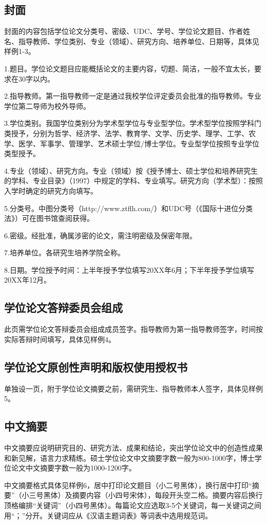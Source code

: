 \subsection{封面}
封面的内容包括学位论文分类号、密级、UDC、学号、学位论文题目、作者姓名、指导教师、学位类别、专业（领域）、研究方向、培养单位、日期等，具体见样例1-3。

1.题目。学位论文题目应能概括论文的主要内容，切题、简洁，一般不宜太长，要求在30字以内。

2.指导教师。第一指导教师一定是通过我校学位评定委员会批准的指导教师。专业学位第二导师为校外导师。

3.学位类别。我国学位类别分为学术型学位与专业型学位。学术型学位按照学科门类授予，分别为哲学、经济学、法学、教育学、文学、历史学、理学、工学、农学、医学、军事学、管理学、艺术硕士学位/博士学位。专业型学位按照专业学位类型授予。

4.专业（领域）、研究方向。专业（领域）按《授予博士、硕士学位和培养研究生的学科、专业目录》（1997）中规定的学科、专业填写。研究方向（学术型）：按照入学时确定的研究方向填写。

5.分类号。中图分类号（http://www.ztflh.com/）和UDC号（《国际十进位分类法》）可在图书馆查阅获得。

6.密级。经批准，确属涉密的论文，需注明密级及保密年限。

7.培养单位。各研究生培养学院全称。

8.日期。学位授予时间：上半年授予学位填写20XX年6月；下半年授予学位填写20XX年12月。

\subsection{学位论文答辩委员会组成}
此页需学位论文答辩委员会组成成员签字。指导教师为第一指导教师签字，时间按实际答辩时间填写，具体见样例4。
\subsection{学位论文原创性声明和版权使用授权书}
单独设一页，附于学位论文摘要之前，需研究生、指导教师本人签字，具体见样例5。
\subsection{中文摘要}
中文摘要应说明研究目的、研究方法、成果和结论，突出学位论文中的创造性成果和新见解，语言力求精练。硕士学位论文中文摘要字数一般为800-1000字，博士学位论文中文摘要字数一般为1000-1200字。

中文摘要格式具体见样例6，居中打印论文题目（小二号黑体），换行居中打印“摘要”（小三号黑体）及摘要内容（小四号宋体），每段开头空二格。摘要内容后换行顶格编排“关键词”（小四号黑体）。每篇论文应选取3-5个关键词，每一关键词之间用“；”分开。关键词应从《汉语主题词表》等词表中选用规范词。
